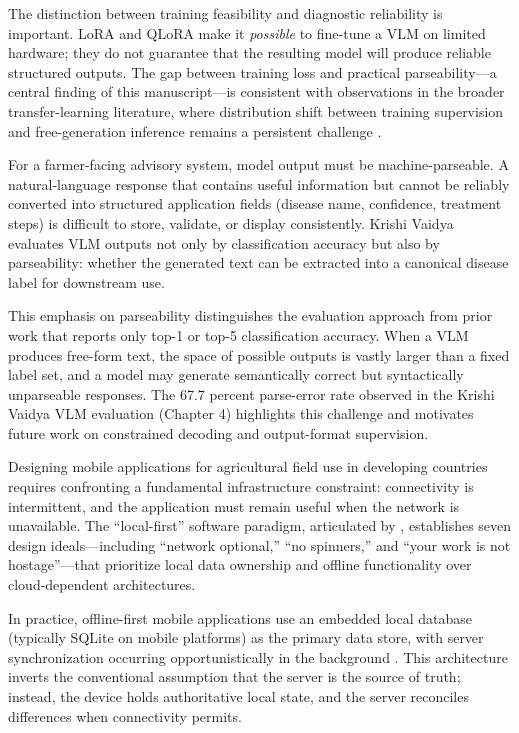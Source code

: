 The distinction between training feasibility and diagnostic reliability is important. LoRA and
QLoRA make it \emph{possible} to fine-tune a VLM on limited hardware; they do not guarantee that
the resulting model will produce reliable structured outputs. The gap between training loss and
practical parseability---a central finding of this manuscript---is consistent with observations
in the broader transfer-learning literature, where distribution shift between training
supervision and free-generation inference remains a persistent challenge
\parencite{zhuangTransferLearningSurvey2021}.


For a farmer-facing advisory system, model output must be machine-parseable. A natural-language
response that contains useful information but cannot be reliably converted into structured
application fields (disease name, confidence, treatment steps) is difficult to store, validate,
or display consistently. Krishi Vaidya evaluates VLM outputs not only by classification
accuracy but also by parseability: whether the generated text can be extracted into a canonical
disease label for downstream use.

This emphasis on parseability distinguishes the evaluation approach from prior work that
reports only top-1 or top-5 classification accuracy. When a VLM produces free-form text,
the space of possible outputs is vastly larger than a fixed label set, and a model may
generate semantically correct but syntactically unparseable responses. The 67.7 percent
parse-error rate observed in the Krishi Vaidya VLM evaluation (Chapter 4) highlights this
challenge and motivates future work on constrained decoding and output-format supervision.


Designing mobile applications for agricultural field use in developing countries requires
confronting a fundamental infrastructure constraint: connectivity is intermittent, and the
application must remain useful when the network is unavailable. The ``local-first'' software
paradigm, articulated by \textcite{kleppmannLocalFirst2019}, establishes seven design
ideals---including ``network optional,'' ``no spinners,'' and ``your work is not hostage''---that
prioritize local data ownership and offline functionality over cloud-dependent architectures.

In practice, offline-first mobile applications use an embedded local database (typically SQLite
on mobile platforms) as the primary data store, with server synchronization occurring
opportunistically in the background \parencite{mehdiOfflineFirstMobile2022}. This architecture
inverts the conventional assumption that the server is the source of truth; instead, the device
holds authoritative local state, and the server reconciles differences when connectivity permits.


